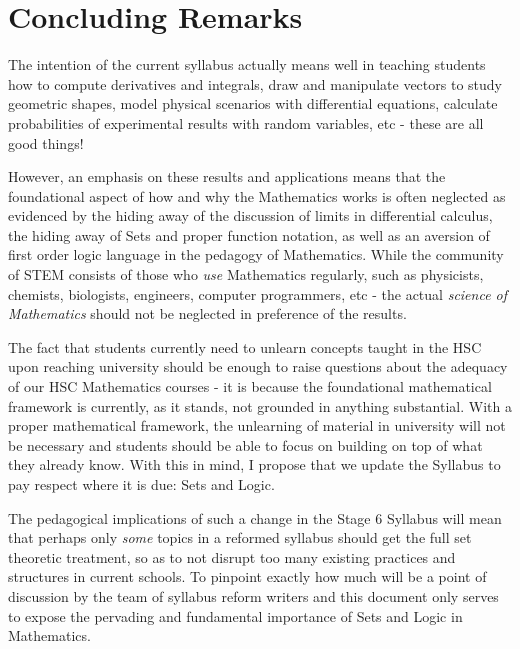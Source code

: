 \documentclass[11pt, a4paper, oneside]{article}
\begin{document}
\section{Concluding Remarks}
The intention of the current syllabus actually means well in teaching students how to compute derivatives and integrals, draw and manipulate vectors to study geometric shapes, model physical scenarios with differential equations, calculate probabilities of experimental results with random variables, etc - these are all good things!

However, an emphasis on these results and applications means that the foundational aspect of how and why the Mathematics works is often neglected as evidenced by the hiding away of the discussion of limits in differential calculus, the hiding away of Sets and proper function notation, as well as an aversion of first order logic language in the pedagogy of Mathematics. While the community of STEM consists of those who \emph{use} Mathematics regularly, such as physicists, chemists, biologists, engineers, computer programmers, etc - the actual \emph{science of Mathematics} should not be neglected in preference of the results.

The fact that students currently need to unlearn concepts taught in the HSC upon reaching university should be enough to raise questions about the adequacy of our HSC Mathematics courses - it is because the foundational mathematical framework is currently, as it stands, not grounded in anything substantial. With a proper mathematical framework, the unlearning of material in university will not be necessary and students should be able to focus on building on top of what they already know. With this in mind, I propose that we update the Syllabus to pay respect where it is due: Sets and Logic.

The pedagogical implications of such a change in the Stage 6 Syllabus will mean that perhaps only \emph{some} topics in a reformed syllabus should get the full set theoretic treatment, so as to not disrupt too many existing practices and structures in current schools. To pinpoint exactly how much will be a point of discussion by the team of syllabus reform writers and this document only serves to expose the pervading and fundamental importance of Sets and Logic in Mathematics.
\end{document}
